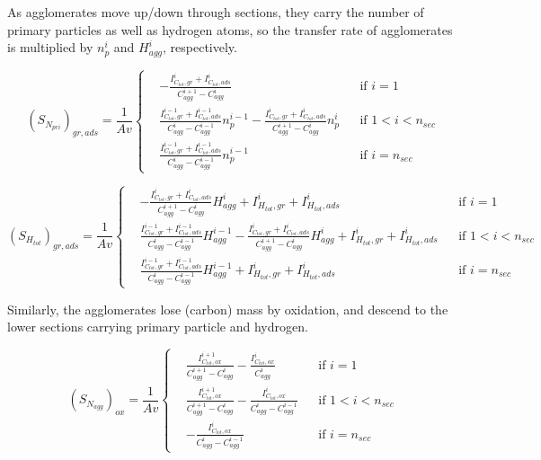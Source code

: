 As agglomerates move up/down through sections, they carry the number of primary particles as well as hydrogen atoms, so the transfer rate of agglomerates is multiplied by ${n^i_p}$ and ${H^i_{agg}}$, respectively. 

\begin{equation}
	\left(S_{N_{pri}}\right)_{gr, ads}=
	\frac{1}{Av}
	\left\{
	\begin{aligned}
		&-\frac{I^i_{C_{tot},gr}+I^i_{C_{tot},ads}}{C^{i+1}_{agg}-C^{i}_{agg}}
		&&
		\text{if } i = 1
		\\
		&\frac{I^{i-1}_{C_{tot},gr}+I^{i-1}_{C_{tot},ads}}{C^{i}_{agg}-C^{i-1}_{agg}}n^{i-1}_p
		-\frac{I^{i}_{C_{tot},gr}+I^{i}_{C_{tot},ads}}{C^{i+1}_{agg}-C^{i}_{agg}}n^{i}_p
		&&
		\text{if } 1 < i < n_{sec}
		\\
		&\frac{I^{i-1}_{C_{tot},gr}+I^{i-1}_{C_{tot},ads}}{C^{i}_{agg}-C^{i-1}_{agg}}n^{i-1}_p
		&&\text{if } i=n_{sec}
	\end{aligned}
	\right.
	\label{eqn:S_Npri_gradssect}
\end{equation}

\begin{equation}
	\left(S_{H_{tot}}\right)_{gr, ads}=
	\frac{1}{Av}
	\left\{
	\begin{aligned}
		&-\frac{I^i_{C_{tot},gr}+I^i_{C_{tot},ads}}{C^{i+1}_{agg}-C^{i}_{agg}}H^{i}_{agg} 
		+ I^{i}_{H_{tot}, gr} + I^{i}_{H_{tot}, ads}
		&&
		\text{if } i = 1
		\\
		&\frac{I^{i-1}_{C_{tot},gr}+I^{i-1}_{C_{tot},ads}}{C^{i}_{agg}-C^{i-1}_{agg}}H^{i-1}_{agg}
		-\frac{I^{i}_{C_{tot},gr}+I^{i}_{C_{tot},ads}}{C^{i+1}_{agg}-C^{i}_{agg}}H^{i}_{agg}
		+ I^{i}_{H_{tot}, gr} + I^{i}_{H_{tot}, ads}
		&&
		\text{if } 1 < i < n_{sec}
		\\
		&\frac{I^{i-1}_{C_{tot},gr}+I^{i-1}_{C_{tot},ads}}{C^{i}_{agg}-C^{i-1}_{agg}}H^{i-1}_{agg}
		+ I^{i}_{H_{tot}, gr} + I^{i}_{H_{tot}, ads}
		&&\text{if } i=n_{sec}
	\end{aligned}
	\right.
	\label{eqn:S_Htot_gradssect}
\end{equation}

Similarly, the agglomerates lose (carbon) mass by oxidation, and descend to the lower sections carrying primary particle and hydrogen.

\begin{equation}
	\left(S_{N_{agg}}\right)_{ox}=
	\frac{1}{Av}
	\left\{
	\begin{aligned}
		&\frac{I^{i+1}_{C_{tot},ox}}{C^{i+1}_{agg}-C^{i}_{agg}}
		-
		\frac{I^{i}_{C_{tot},ox}}{C^{i}_{agg}}
		&&
		\text{if } i = 1
		\\
		&\frac{I^{i+1}_{C_{tot},ox}}{C^{i+1}_{agg}-C^{i}_{agg}}
		-
		\frac{I^{i}_{C_{tot},ox}}{C^{i}_{agg}-C^{i-1}_{agg}}
		&&
		\text{if } 1 < i < n_{sec}
		\\
		&
		-
		\frac{I^{i}_{C_{tot},ox}}{C^{i}_{agg}-C^{i-1}_{agg}}
		&&\text{if } i=n_{sec}
	\end{aligned}
	\right.
	\label{eqn:S_Nagg_oxsect}
\end{equation}

